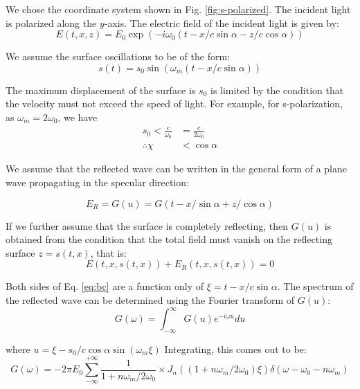 \documentclass[12pt]{article}
\newcounter{subsubsubsection}[subsubsection]
\begin{document}
We chose the coordinate system shown in Fig. \ref{fig:s-polarized}. The incident light is polarized along the $y$-axis. The electric field of the incident light is given by:
\begin{equation*}
    E(t, x, z) = E_0 \exp\left(-i\omega_0\left(t-x/c \sin\alpha - z/c \cos\alpha\right)\right)
\end{equation*}

We assume the surface oscillations to be of the form:
\begin{equation*}
    s(t) = s_0 \sin\left( \omega_m \left(t - x/c \sin\alpha\right) \right)
\end{equation*}

The maximum displacement of the surface is $s_0$ is limited by the condition that the velocity must not exceed the speed of light. For example, for s-polarization, as $\omega_m = 2 \omega_0$, we have
\begin{align*}
    s_0 < \frac{c}{\omega_0} & = \frac{c}{2\omega_0} \\
    \therefore \chi          & < \cos\alpha
\end{align*}

We assume that the reflected wave can be written in the general form of a plane wave propagating in the specular direction:

\begin{equation*}
    E_R = G(u) = G(t - x/\sin\alpha + z/\cos\alpha)
\end{equation*}

If we further assume that the surface is completely reflecting, then $G(u)$ is obtained from the condition that the total field must vanish on the reflecting surface $z = s(t,x)$, that is:
\begin{equation}
    \label{eq:bc}
    E(t,x,s(t,x)) + E_R(t,x,s(t,x)) = 0
\end{equation}

Both sides of Eq. \ref{eq:bc} are a function only of $\xi = t - x/c \sin\alpha$. The spectrum of the reflected wave can be determined using the Fourier transform of $G(u)$:
\begin{equation*}
    G(\omega) = \int_{-\infty}^{\infty} G(u) e^{-i\omega u} du
\end{equation*}

where $u = \xi - s_0/c \cos\alpha \sin(\omega_m \xi)$ Integrating, this comes out to be:
\begin{equation}
    \label{eq:G_omega}
    G(\omega) = -2 \pi E_0 \sum_{-\infty}^{+\infty} \frac{1}{1+ n\omega_m /2 \omega_0} \times J_n \left(\left( 1+ n\omega_m /2\omega_0\right)\xi\right)\delta \left(\omega - \omega_0 - n\omega_m\right)
\end{equation}
\end{document}
